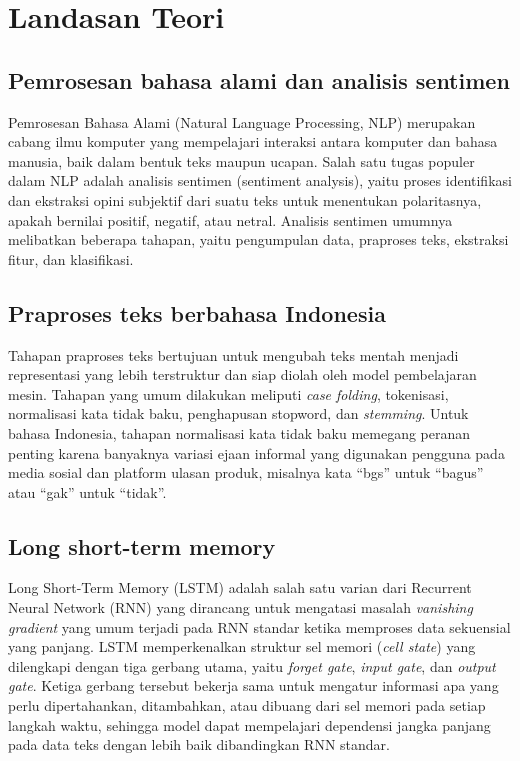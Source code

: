 \section{Landasan Teori}

\subsection{Pemrosesan bahasa alami dan analisis sentimen}
Pemrosesan Bahasa Alami (Natural Language Processing, NLP) merupakan
cabang ilmu komputer yang mempelajari interaksi antara komputer dan
bahasa manusia, baik dalam bentuk teks maupun ucapan. Salah satu
tugas populer dalam NLP adalah analisis sentimen (sentiment
analysis), yaitu proses identifikasi dan ekstraksi opini subjektif
dari suatu teks untuk menentukan polaritasnya, apakah bernilai
positif, negatif, atau netral. Analisis sentimen umumnya melibatkan
beberapa tahapan, yaitu pengumpulan data, praproses teks, ekstraksi
fitur, dan klasifikasi.

\subsection{Praproses teks berbahasa Indonesia}
Tahapan praproses teks bertujuan untuk mengubah teks mentah menjadi
representasi yang lebih terstruktur dan siap diolah oleh model
pembelajaran mesin. Tahapan yang umum dilakukan meliputi \textit{case
folding}, tokenisasi, normalisasi kata tidak baku, penghapusan
stopword, dan \textit{stemming}. Untuk bahasa Indonesia, tahapan
normalisasi kata tidak baku memegang peranan penting karena banyaknya
variasi ejaan informal yang digunakan pengguna pada media sosial dan
platform ulasan produk, misalnya kata ``bgs'' untuk ``bagus'' atau
``gak'' untuk ``tidak''.

\subsection{Long short-term memory}
Long Short-Term Memory (LSTM) adalah salah satu varian dari Recurrent
Neural Network (RNN) yang dirancang untuk mengatasi masalah
\textit{vanishing gradient} yang umum terjadi pada RNN standar ketika
memproses data sekuensial yang panjang. LSTM memperkenalkan struktur
sel memori (\textit{cell state}) yang dilengkapi dengan tiga gerbang
utama, yaitu \textit{forget gate}, \textit{input gate}, dan
\textit{output gate}. Ketiga gerbang tersebut bekerja sama untuk
mengatur informasi apa yang perlu dipertahankan, ditambahkan, atau
dibuang dari sel memori pada setiap langkah waktu, sehingga model
dapat mempelajari dependensi jangka panjang pada data teks dengan
lebih baik dibandingkan RNN standar.

